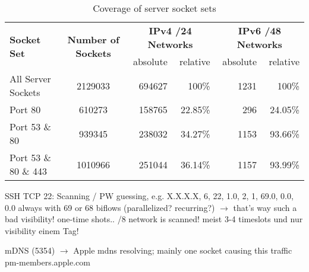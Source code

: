 \begin{table}[ht]
	\centering
\begin{tabular}{|l|c|r|r|r|r|}
\hline
\multirow{2}{*}{\textbf{Socket Set}} & \multirow{2}{*}{\textbf{Number of Sockets}}  & \multicolumn{2}{|c|}{\textbf{IPv4 /24 Networks}} & \multicolumn{2}{|c|}{\textbf{IPv6 /48 Networks}} \\
\cline{3-6}
& & absolute & relative & absolute & relative \\ \hline \hline
All Server Sockets & 2129033 & 694627 & 100\% & 1231 & 100\% \\ \hline
Port 80 & 610273 & 158765 & 22.85\% & 296 & 24.05\% \\ \hline
Port 53 \& 80 & 939345 & 238032 & 34.27\% & 1153 & 93.66\% \\ \hline
Port 53 \& 80 \& 443 & 1010966 & 251044 & 36.14\% & 1157 & 93.99\% \\ \hline

\end{tabular}
\caption{Coverage of server socket sets}
\end{table}

SSH TCP 22: Scanning / PW guessing, e.g. X.X.X.X, 6, 22, 1.0, 2, 1, 69.0, 0.0, 0.0
always with 69 or 68 biflows (parallelized? recurring?) $\rightarrow$ that's way such a bad visibility! one-time shots.. /8 network is scanned! meist 3-4 timeslots und nur visibility einem Tag! 

mDNS (5354) $\rightarrow$ Apple mdns resolving; mainly one socket causing this traffic pm-members.apple.com


